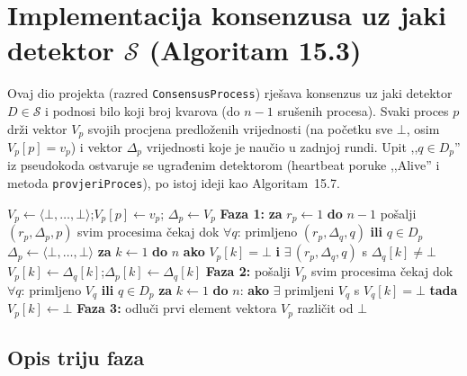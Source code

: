 \documentclass[11pt,a4paper]{article}
\newcommand{\Ds}{\ensuremath{\mathcal{S}}}
\begin{document}
\section{Implementacija konsenzusa uz jaki detektor \Ds{} (Algoritam 15.3)}
\label{sec:kons-s}

Ovaj dio projekta (razred \texttt{ConsensusProcess}) rješava konsenzus uz jaki
detektor $D \in \Ds$ i podnosi bilo koji broj kvarova (do $n-1$ srušenih
procesa). Svaki proces $p$ drži vektor $V_p$ svojih procjena predloženih
vrijednosti (na početku sve $\bot$, osim $V_p[p] = v_p$) i vektor $\Delta_p$
vrijednosti koje je naučio u zadnjoj rundi. Upit ,,$q \in D_p$'' iz pseudokoda
ostvaruje se ugrađenim detektorom (heartbeat poruke ,,Alive'' i metoda
\texttt{provjeriProces}), po istoj ideji kao Algoritam~15.7.

\begin{algorithm}[h]
\caption{Konsenzus uz jaki detektor $D \in \Ds$ (procedura \textsc{propose}$(v_p)$
na procesu $p$)}
\label{alg:S}
\begin{algorithmic}[1]
\State $V_p \gets \langle \bot, \dots, \bot \rangle$;\quad $V_p[p] \gets v_p$;
  \quad $\Delta_p \gets V_p$
\Statex \textbf{Faza 1:} \textbf{za} $r_p \gets 1$ \textbf{do} $n-1$
  \State \quad pošalji $(r_p, \Delta_p, p)$ svim procesima
  \State \quad čekaj dok $\forall q$: primljeno $(r_p, \Delta_q, q)$ \textbf{ili}
  $q \in D_p$ 
  \State \quad $\Delta_p \gets \langle \bot, \dots, \bot \rangle$
  \State \quad \textbf{za} $k \gets 1$ \textbf{do} $n$
  \State \qquad \textbf{ako} $V_p[k] = \bot$ \textbf{i} $\exists\,(r_p, \Delta_q, q)$
  s $\Delta_q[k] \ne \bot$
  \State \qquad\quad $V_p[k] \gets \Delta_q[k]$;\quad $\Delta_p[k] \gets \Delta_q[k]$
\Statex \textbf{Faza 2:}
  \State \quad pošalji $V_p$ svim procesima
  \State \quad čekaj dok $\forall q$: primljeno $V_q$ \textbf{ili} $q \in D_p$
  \State \quad \textbf{za} $k \gets 1$ \textbf{do} $n$: \textbf{ako} $\exists$
  primljeni $V_q$ s $V_q[k] = \bot$ \textbf{tada} $V_p[k] \gets \bot$
\Statex \textbf{Faza 3:}
  \State \quad odluči prvi element vektora $V_p$ različit od $\bot$
\end{algorithmic}
\end{algorithm}

\subsection{Opis triju faza}
\end{document}
